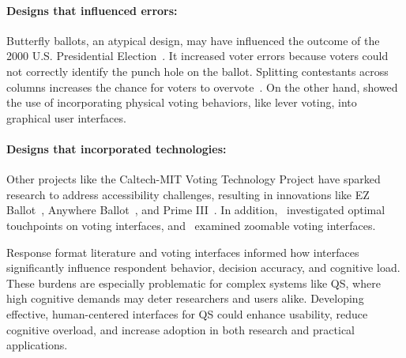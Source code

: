 \paragraph{Designs that influenced errors: } Butterfly ballots, an atypical design, may have influenced the outcome of the 2000 U.S. Presidential Election~\cite{wandButterflyDidIt2001}. It increased voter errors because voters could not correctly identify the punch hole on the ballot. Splitting contestants across columns increases the chance for voters to overvote~\cite{quesenberyOpinionGoodDesign2020}. On the other hand, \citet{everettElectronicVotingMachines2008} showed the use of incorporating physical voting behaviors, like lever voting, into graphical user interfaces.

\paragraph{Designs that incorporated technologies: } Other projects like the Caltech-MIT Voting Technology Project have sparked research to address accessibility challenges, resulting in innovations like EZ Ballot~\cite{leeUniversalDesignBallot2016}, Anywhere Ballot~\cite{summers2014making}, and Prime III~\cite{dawkinsPrimeIIIInnovative2009}. In addition,~\citet{gilbertAnomalyDetectionElectronic2013} investigated optimal touchpoints on voting interfaces, and~\citet{conradElectronicVotingEliminates2009} examined zoomable voting interfaces.

Response format literature and voting interfaces informed how interfaces significantly influence respondent behavior, decision accuracy, and cognitive load. These burdens are especially problematic for complex systems like QS, where high cognitive demands may deter researchers and users alike. Developing effective, human-centered interfaces for QS could enhance usability, reduce cognitive overload, and increase adoption in both research and practical applications.

